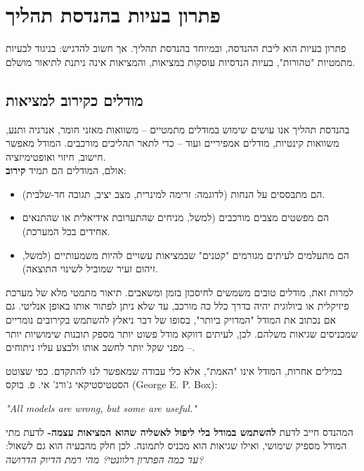\documentclass[
  hebrew,
  letterpaper,
  DIV=11,
  numbers=noendperiod]{scrreprt}
\begin{document}
\section{\texorpdfstring{{פתרון בעיות בהנדסת
תהליך}}{פתרון בעיות בהנדסת תהליך}}\label{ux5e4ux5eaux5e8ux5d5ux5df-ux5d1ux5e2ux5d9ux5d5ux5ea-ux5d1ux5d4ux5e0ux5d3ux5e1ux5ea-ux5eaux5d4ux5dcux5d9ux5da}

{פתרון בעיות הוא ליבת ההנדסה, ובמיוחד בהנדסת תהליך. אך חשוב להדגיש:
בניגוד לבעיות מתמטיות "טהורות", בעיות הנדסיות עוסקות במציאות, והמציאות
אינה ניתנת לתיאור מושלם}.

\subsection{\texorpdfstring{{מודלים כקירוב
למציאות}}{מודלים כקירוב למציאות}}\label{ux5deux5d5ux5d3ux5dcux5d9ux5dd-ux5dbux5e7ux5d9ux5e8ux5d5ux5d1-ux5dcux5deux5e6ux5d9ux5d0ux5d5ux5ea}

{בהנדסת תהליך אנו עושים שימוש במודלים מתמטיים -- משוואות מאזני חומר,
אנרגיה ותנע, משוואות קינטיות, מודלים אמפיריים ועוד -- כדי לתאר תהליכים
מורכבים. המודל מאפשר חישוב, חיזוי ואופטימיזציה}.\\
{אולם, המודלים הם תמיד \textbf{קירוב}}:

\begin{itemize}
\item
  {הם מתבססים על הנחות (לדוגמה: זרימה למינרית, מצב יציב, תגובה
  חד-שלבית)}.
\item
  {הם מפשטים מצבים מורכבים (למשל, מניחים שהתערובת אידיאלית או שהתנאים
  אחידים בכל המערכת)}.
\item
  {הם מתעלמים לעיתים מגורמים "קטנים" שבמציאות עשויים להיות משמעותיים
  (למשל, זיהום זעיר שמוביל לשינוי התוצאה)}.
\end{itemize}

{למרות זאת, מודלים טובים משמשים לחיסכון בזמן ומשאבים. תיאור מתמטי מלא של
מערכת פיזיקלית או ביולוגית יהיה בדרך כלל כה מורכב, עד שלא ניתן לפתור
אותו באופן אנליטי. גם אם נכתוב את המודל "המדויק ביותר", בסופו של דבר
ניאלץ להשתמש בקירובים נומריים שמכניסים שגיאות משלהם. לכן, לעיתים דווקא
מודל פשוט יותר מספק תובנות שימושיות יותר -- מפני שקל יותר לחשב אותו
ולבצע עליו ניתוחים}.

{במילים אחרות, המודל אינו "האמת", אלא כלי עבודה שמאפשר לנו להתקדם. כפי
שצוטט הסטטיסטיקאי ג'ורג' אי. פ. בוקס} (George E. P. Box){:}

\emph{"All models are wrong, but some are useful."}

{המהנדס חייב לדעת \textbf{להשתמש במודל בלי ליפול לאשליה שהוא המציאות
עצמה-} לדעת מתי המודל מספיק שימושי, ואילו שגיאות הוא מכניס לתמונה}. {לכן
חלק מהבעיה הוא גם לשאול: \emph{עד כמה הפתרון רלוונטי? מהי רמת הדיוק
הדרושה}}\emph{?}
\end{document}
